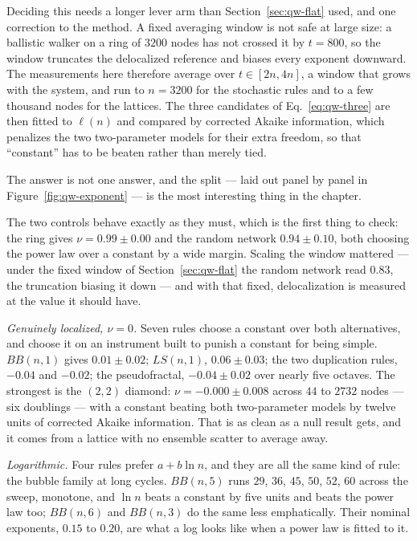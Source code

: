 Deciding this needs a longer lever arm than Section~\ref{sec:qw-flat} used, and one
correction to the method. A fixed averaging window is not safe at large size: a
ballistic walker on a ring of $3200$ nodes has not crossed it by $t=800$, so the
window truncates the delocalized reference and biases every exponent downward. The
measurements here therefore average over $t\in[2n,4n]$, a window that grows with the
system, and run to $n=3200$ for the stochastic rules and to a few thousand nodes for
the lattices. The three candidates of Eq.~\eqref{eq:qw-three} are then fitted to
$\ell(n)$ and compared by corrected Akaike information, which penalizes the two
two-parameter models for their extra freedom, so that ``constant'' has to be beaten
rather than merely tied.




\noindent The answer is not one answer, and the split --- laid out panel by panel in
Figure~\ref{fig:qw-exponent} --- is the most interesting thing in the chapter.

The two controls behave exactly as they must, which is the first thing to check: the
ring gives $\nu=0.99\pm0.00$ and the random network $0.94\pm0.10$, both choosing the
power law over a constant by a wide margin. Scaling the window mattered --- under the
fixed window of Section~\ref{sec:qw-flat} the random network read $0.83$, the
truncation biasing it down --- and with that fixed, delocalization is measured at the
value it should have.

\emph{Genuinely localized, $\nu=0$.} Seven rules choose a constant over both
alternatives, and choose it on an instrument built to punish a constant for being
simple. $BB(n,1)$ gives $0.01\pm0.02$; $LS(n,1)$, $0.06\pm0.03$; the two duplication
rules, $-0.04$ and $-0.02$; the pseudofractal, $-0.04\pm0.02$ over nearly five
octaves. The strongest is the $(2,2)$ diamond: $\nu=-0.000\pm0.008$ across $44$ to
$2732$ nodes --- six doublings --- with a constant beating both two-parameter models by
twelve units of corrected Akaike information. That is as clean as a null result gets,
and it comes from a lattice with no ensemble scatter to average away.

\emph{Logarithmic.} Four rules prefer $a+b\ln n$, and they are all the same kind of
rule: the bubble family at long cycles. $BB(n,5)$ runs $29$, $36$, $45$, $50$, $52$,
$60$ across the sweep, monotone, and $\ln n$ beats a constant by five units and beats
the power law too; $BB(n,6)$ and $BB(n,3)$ do the same less emphatically. Their
nominal exponents, $0.15$ to $0.20$, are what a log looks like when a power law is
fitted to it.

